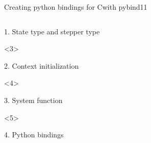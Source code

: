 \documentclass[@BEAMER_OPTIONS@]{beamer}
\newcommand{\CXX}{{\rm C}\plusplus}
\begin{document}
\begin{frame}[fragile]{Creating python bindings for \CXX with pybind11}
\begin{columns}
\begin{column}[c]{0.6\textwidth}
\begin{onlyenv}
\begin{exampleblock}{1. State type and stepper type}
                    \begin{adjustbox}{width=0.78\textwidth, height=\textheight, keepaspectratio}
                        \begin{minipage}{\textwidth}
                            
                        \end{minipage}
                    \end{adjustbox}
                \end{exampleblock}
            \end{onlyenv}
            \begin{onlyenv}<3>
                \begin{exampleblock}{2. Context initialization}
                    \begin{adjustbox}{width=0.75\textwidth, height=\textheight, keepaspectratio}
                        \begin{minipage}{\textwidth}
                            
                        \end{minipage}
                    \end{adjustbox}
                \end{exampleblock}
            \end{onlyenv}
            \begin{onlyenv}<4>
                \begin{exampleblock}{3. System function}
                    \begin{adjustbox}{width=0.6\textwidth, height=\textheight, keepaspectratio}
                        \begin{minipage}{\textwidth}
                            
                        \end{minipage}
                    \end{adjustbox}
                \end{exampleblock}
            \end{onlyenv}
            \begin{onlyenv}<5>
                \begin{exampleblock}{4. Python bindings}
                    \begin{adjustbox}{width=0.78\textwidth, height=\textheight, keepaspectratio}
                        \begin{minipage}{\textwidth}

\end{minipage}
\end{adjustbox}
\end{exampleblock}
\end{onlyenv}
\end{column}
\end{columns}
\end{frame}
\end{document}
